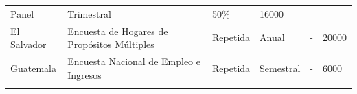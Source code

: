 \documentclass[12pt,spanish,]{book}
\begin{document}
\begin{longtable}[]{@{}llllll@{}}
\begin{minipage}[t]{0.06\columnwidth}
Panel\strut
\end{minipage} & \begin{minipage}[t]{0.08\columnwidth}\raggedright
Trimestral\strut
\end{minipage} & \begin{minipage}[t]{0.06\columnwidth}\raggedright
50\%\strut
\end{minipage} & \begin{minipage}[t]{0.13\columnwidth}\raggedright
16000\strut
\end{minipage}\tabularnewline
\begin{minipage}[t]{0.13\columnwidth}\raggedright
El Salvador\strut
\end{minipage} & \begin{minipage}[t]{0.38\columnwidth}\raggedright
Encuesta de Hogares de Propósitos Múltiples\strut
\end{minipage} & \begin{minipage}[t]{0.06\columnwidth}\raggedright
Repetida\strut
\end{minipage} & \begin{minipage}[t]{0.08\columnwidth}\raggedright
Anual\strut
\end{minipage} & \begin{minipage}[t]{0.06\columnwidth}\raggedright
-\strut
\end{minipage} & \begin{minipage}[t]{0.13\columnwidth}\raggedright
20000\strut
\end{minipage}\tabularnewline
\begin{minipage}[t]{0.13\columnwidth}\raggedright
Guatemala\strut
\end{minipage} & \begin{minipage}[t]{0.38\columnwidth}\raggedright
Encuesta Nacional de Empleo e Ingresos\strut
\end{minipage} & \begin{minipage}[t]{0.06\columnwidth}\raggedright
Repetida\strut
\end{minipage} & \begin{minipage}[t]{0.08\columnwidth}\raggedright
Semestral\strut
\end{minipage} & \begin{minipage}[t]{0.06\columnwidth}\raggedright
-\strut
\end{minipage} & \begin{minipage}[t]{0.13\columnwidth}\raggedright
6000\strut
\end{minipage}\tabularnewline
\begin{minipage}[t]{0.13\columnwidth}\raggedright

\end{minipage}
\end{longtable}
\end{document}
